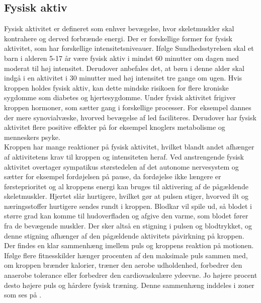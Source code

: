 \subsection{Fysisk aktiv}
Fysisk aktivitet er defineret som enhver bevægelse, hvor skeletmuskler skal kontrahere og derved forbrænde energi. Der er forskellige former for fysisk aktivitet, som har forskellige intensitetsniveauer.\citep{Academic2016a} Ifølge Sundhedsstyrelsen skal et barn i alderen 5-17 år være fysisk aktiv i mindst 60 minutter om dagen med moderat til høj intensitet. Derudover anbefales det, at børn i denne alder skal indgå i en aktivitet i 30 minutter med høj intensitet tre gange om ugen. Hvis kroppen holdes fysisk aktiv, kan dette mindske risikoen for flere kroniske sygdomme som diabetes og hjertesygdomme. Under fysisk aktivitet frigiver kroppen hormoner, som sætter gang i forskellige processer. For eksempel dannes der mere synovialvæske, hvorved bevægelse af led faciliteres. Derudover har fysisk aktivitet flere positive effekter på for eksempel knoglers metabolisme og menneskers psyke. \citep{Smith1991,Academic2016a,Academic2016b,Cotman2007} \\
Kroppen har mange reaktioner på fysisk aktivitet, hvilket blandt andet afhænger af aktivitetens krav til kroppen og intensiteten heraf. Ved anstrengende fysisk aktivitet overtager sympatikus størstedelen af det autonome nervesystem og sætter for eksempel fordøjelsen på pause, da fordøjelse ikke længere er førsteprioritet og al kroppens energi kan bruges til aktivering af de pågældende skeletmuskler. Hjertet slår hurtigere, hvilket gør at pulsen stiger, hvorved ilt og næringsstoffer hurtigere sendes rundt i kroppen\citep{Hjerteforeningen}. Blodkar vil spile ud, så blodet i større grad kan komme til hudoverfladen og afgive den varme, som blodet fører fra de bevægende muskler. Der sker altså en stigning i pulsen og blodtrykket, og denne stigning afhænger af den pågældende aktivitets påvirkning på kroppen.\citep{Martini2012,Stanfield2013,Berchtold2010} \\
Der findes en klar sammenhæng imellem puls og kroppens reaktion på motionen. Ifølge flere fitnesskilder hænger procenten af den maksimale puls sammen med, om kroppen brænder kalorier, træner den aerobe udholdenhed, forbedrer den anaerobe tolerance eller forbedrer den cardiovaskulære ydeevne. Jo højere procent desto højere puls og hårdere fysisk træning. Denne sammenhæng inddeles i zoner som ses på .\citep{Leyland2007,Heartratejournal2015}
